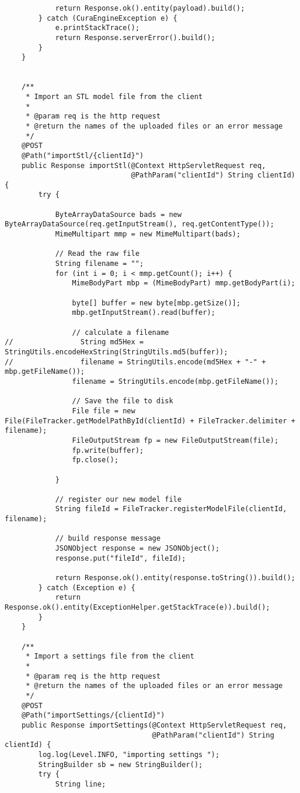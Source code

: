 \begin{lstlisting}
            return Response.ok().entity(payload).build();
        } catch (CuraEngineException e) {
            e.printStackTrace();
            return Response.serverError().build();
        }
    }


    /**
     * Import an STL model file from the client
     *
     * @param req is the http request
     * @return the names of the uploaded files or an error message
     */
    @POST
    @Path("importStl/{clientId}")
    public Response importStl(@Context HttpServletRequest req,
                              @PathParam("clientId") String clientId) {
        try {

            ByteArrayDataSource bads = new ByteArrayDataSource(req.getInputStream(), req.getContentType());
            MimeMultipart mmp = new MimeMultipart(bads);

            // Read the raw file
            String filename = "";
            for (int i = 0; i < mmp.getCount(); i++) {
                MimeBodyPart mbp = (MimeBodyPart) mmp.getBodyPart(i);

                byte[] buffer = new byte[mbp.getSize()];
                mbp.getInputStream().read(buffer);

                // calculate a filename
//                String md5Hex = StringUtils.encodeHexString(StringUtils.md5(buffer));
//                filename = StringUtils.encode(md5Hex + "-" + mbp.getFileName());
                filename = StringUtils.encode(mbp.getFileName());

                // Save the file to disk
                File file = new File(FileTracker.getModelPathById(clientId) + FileTracker.delimiter + filename);
                FileOutputStream fp = new FileOutputStream(file);
                fp.write(buffer);
                fp.close();

            }

            // register our new model file
            String fileId = FileTracker.registerModelFile(clientId, filename);

            // build response message
            JSONObject response = new JSONObject();
            response.put("fileId", fileId);

            return Response.ok().entity(response.toString()).build();
        } catch (Exception e) {
            return Response.ok().entity(ExceptionHelper.getStackTrace(e)).build();
        }
    }

    /**
     * Import a settings file from the client
     *
     * @param req is the http request
     * @return the names of the uploaded files or an error message
     */
    @POST
    @Path("importSettings/{clientId}")
    public Response importSettings(@Context HttpServletRequest req,
                                   @PathParam("clientId") String clientId) {
        log.log(Level.INFO, "importing settings ");
        StringBuilder sb = new StringBuilder();
        try {
            String line;


\end{lstlisting}
